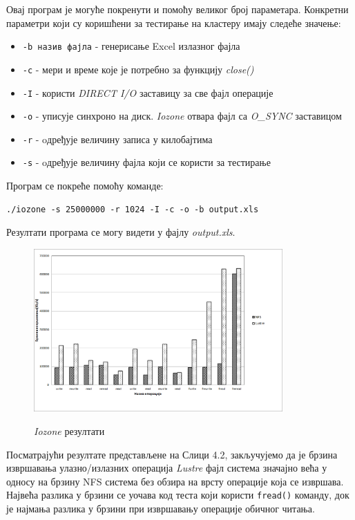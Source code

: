 Овај програм је могуће покренути и помоћу великог број параметара. Конкретни параметри који су коришћени за тестирање на кластеру имају следеће значење:

\begin{itemize}
\item \texttt{-b назив фајла} - генерисање Excel излазног фајла
\item \texttt{-c} - мери и време које је потребно за функцију \textit{ close()}
\item \texttt{-I} - користи \textit{DIRECT I/O} заставицу за све фајл операције
\item \texttt{-о} - уписује синхроно на диск. \textit{Iozone} отвара фајл са \textit{O\_SYNC} заставицом
\item \texttt{-r} - oдређује величину записа у килобајтима
\item \texttt{-s} - oдређује величину фајла који се користи за тестирање 
\end{itemize}
Програм се покреће помоћу команде:
\begin{verbatim}
./iozone -s 25000000 -r 1024 -I -c -o -b output.xls
\end{verbatim}

Резултати програма се могу видети у фајлу \textit{output.xls}.

  \begin{figure}[h!]
    \centering
        \includegraphics[width=0.85\textwidth]{slike/results/iozone.png}\\[1cm]
    \caption{\textit{Iozone} резултати}
  \end{figure}
  
Посматрајући резултате представљене на Слици 4.2, закључујемо да је брзина извршавања улазно/излазних операција \textit{Lustre} фајл система значајно већа у односу на брзину NFS система без обзира на врсту операције која се извршава. Највећа разлика у брзини се уочава код теста који користи \texttt{fread()} команду, док је најмања разлика у брзини при извршавању операције обичног читања.
  
